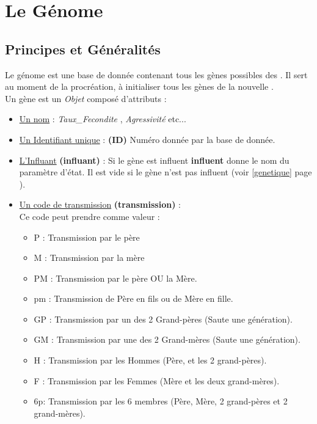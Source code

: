 \documentclass[french]{report}
\begin{document}
\newpage	
\chapter{Le Génome}\label{genome}
\section{Principes et Généralités}
Le génome est une base de donnée contenant tous les gènes possibles des \CoCiX.
Il sert au moment de la procréation, à initialiser tous les gènes de la nouvelle \CoCiX.\\

Un gène est un \textit{Objet} composé d'attributs :

\begin{itemize}
	\item \underline{Un nom}  : \textit{Taux\_Fecondite} , \textit{Agressivité} etc...\\
	\item \underline{Un Identifiant unique} : \textbf{(ID)}  Numéro donnée par la base de donnée.\\
	\item \underline{L'Influant} \textbf{(influant)} : Si le gène est influent  \textbf{influent} donne le nom du paramètre d'état. Il est vide si le gène n'est pas influent (voir  \ref{genetique} page \pageref{genetique}).\\
	\item \underline{Un code de transmission} \textbf{(transmission)} :\\
	Ce code peut prendre comme valeur :
	\begin{itemize}
		\item P : Transmission par le père
		\item M : Transmission par la mère
		\item PM : Transmission par le père OU la Mère.
		\item pm : Transmission de Père en fils ou de Mère en fille.
		\item GP : Transmission par un des 2 Grand-pères (Saute une génération).
		\item GM : Transmission par une des 2  Grand-mères (Saute une génération).
		\item H : Transmission par les Hommes (Père, et les 2 grand-pères).
		\item F : Transmission par les Femmes (Mère et les deux grand-mères).
		\item 6p: Transmission par les 6 membres (Père, Mère, 2 grand-pères et 2 grand-mères).
	\end{itemize}
	

\end{itemize}
\end{document}
